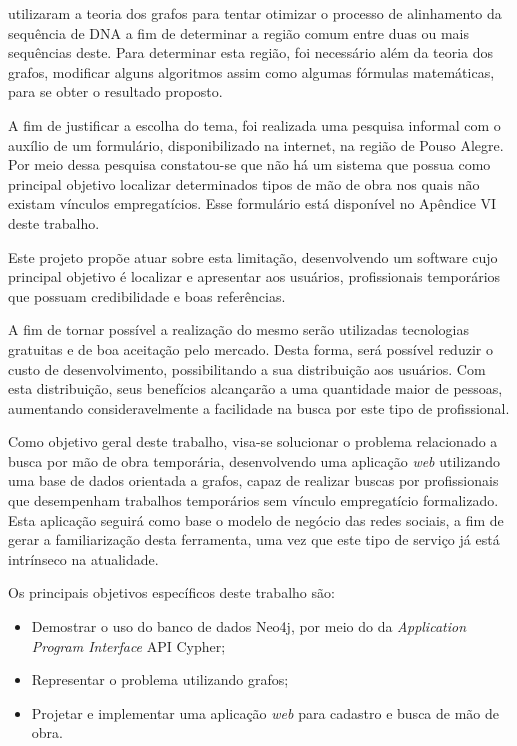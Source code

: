 \par {} utilizaram a teoria dos grafos para tentar otimizar o processo de alinhamento da sequência de DNA a fim de determinar a região comum entre duas ou mais sequências deste. Para determinar esta região, foi necessário além da teoria dos grafos, modificar alguns algoritmos assim como algumas fórmulas matemáticas, para se obter o resultado proposto.

\par A fim de justificar a escolha do tema, foi realizada uma pesquisa informal com o auxílio de um formulário, disponibilizado na internet, na região de Pouso Alegre. Por meio dessa pesquisa constatou-se que não há um sistema que possua como principal objetivo localizar determinados tipos de mão de obra nos quais não existam vínculos empregatícios. Esse formulário está disponível no Apêndice VI deste trabalho.

\par Este projeto propõe atuar sobre esta limitação, desenvolvendo um software cujo principal objetivo é localizar e apresentar aos usuários, profissionais temporários que possuam credibilidade e boas referências.

\par A fim de tornar possível a realização do mesmo serão utilizadas tecnologias gratuitas e de boa aceitação pelo mercado. Desta forma, será possível reduzir o custo de desenvolvimento, possibilitando a sua distribuição aos usuários. Com esta distribuição, seus benefícios alcançarão a uma quantidade maior de pessoas, aumentando consideravelmente a facilidade na busca por este tipo de profissional.

\par Como objetivo geral deste trabalho, visa-se solucionar o problema relacionado a busca por mão de obra temporária, desenvolvendo uma aplicação \textit{web} utilizando uma base de dados orientada a grafos, capaz de realizar buscas por profissionais que desempenham trabalhos temporários sem vínculo empregatício formalizado. Esta aplicação seguirá como base o modelo de negócio das redes sociais, a fim de gerar a familiarização desta ferramenta, uma vez que este tipo de serviço já está intrínseco na atualidade.

\par Os principais objetivos específicos deste trabalho são:

\begin{itemize}
	\item Demostrar o uso do banco de dados Neo4j, por meio do da \textit{Application Program Interface} API Cypher;
	\item Representar o problema utilizando grafos;
	\item Projetar e implementar uma aplicação \textit{web} para cadastro e busca de mão de obra.
\end{itemize}

